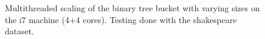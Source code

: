 \begin{landscape}
\begin{figure}[!h]
{        }
        \label{fig:ts_i7_shake_btree}
        \caption{Multithreaded scaling of the binary tree bucket with varying sizes on the
        i7 machine (4+4 cores). Testing done with the shakespeare dataset.}
    \end{figure}
    \begin{figure}[!h]
\end{figure}
\end{landscape}
